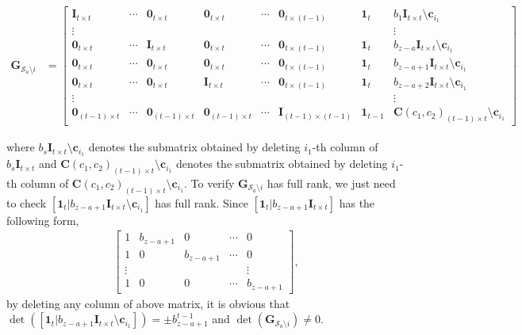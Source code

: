 \documentclass[journal,twocolumn]{IEEEtran}
\theoremstyle{definition}
\newcommand{\calS}{\mathcal{S}}
\newcommand{\bfc}{\mathbf{c}}
\newcommand{\bfG}{\mathbf{G}}
\newcommand{\bfI}{\mathbf{I}}
\newcommand{\bfC}{\mathbf{C}}
\newcommand{\bfzr}{\mathbf{0}}
\newcommand{\bfoe}{\mathbf{1}}
\begin{document}
\begin{itemize}
	\begin{table*}[t]
	\begin{align}
		\bfG_{\calS_a\setminus i}&=
		\begin{bmatrix}
			\bfI_{t\times t}& \cdots& \bfzr_{t\times t} &\bfzr_{t\times t} &\cdots&\bfzr_{t\times (t-1)}&\bfoe_t&{b_1}\bfI_{t\times t}\setminus \bfc_{i_1}\\
			\vdots&&&&&&&\vdots\\
			\bfzr_{t\times t}& \cdots& \bfI_{t\times t} &\bfzr_{t\times t} &\cdots&\bfzr_{t\times (t-1)}&\bfoe_t&{b_{z-a}}\bfI_{t\times t}\setminus \bfc_{i_1}\\
			\bfzr_{t\times t}& \cdots& \bfzr_{t\times t} &\bfzr_{t\times t} &\cdots&\bfzr_{t\times (t-1)}&\bfoe_t&{b_{z-a+1}}\bfI_{t\times t}\setminus \bfc_{i_1}\\
			\bfzr_{t\times t}& \cdots& \bfzr_{t\times t} &\bfI_{t\times t} &\cdots&\bfzr_{t\times (t-1)}&\bfoe_t&{b_{z-a+2}}\bfI_{t\times t}\setminus \bfc_{i_1}\\
			\vdots&&&&&&&\vdots\\
			\bfzr_{(t-1)\times t}& \cdots& \bfzr_{(t-1)\times t} &\bfzr_{(t-1)\times t} &\cdots&\bfI_{(t-1)\times (t-1)}&\bfoe_{t-1}&\bfC(c_1, c_2)_{(t-1)\times t}\setminus \bfc_{i_1}
		\end{bmatrix}
				\label{eq:case4_G2}
	\end{align}
\end{table*}
	where ${b_s}\bfI_{t\times t}\setminus \bfc_{i_1}$ denotes the submatrix obtained by deleting $i_1$-th column of ${b_s}\bfI_{t\times t}$ and $\bfC(c_1, c_2)_{(t-1)\times t}\setminus \bfc_{i_1}$ denotes the submatrix obtained by deleting $i_1$-th column of $\bfC(c_1, c_2)_{(t-1)\times t}\setminus \bfc_{i_1}$. To verify $\bfG_{\calS_a\setminus i}$ has full rank, we just need to check $[\bfoe_t|{b_{z-a+1}}\bfI_{t\times t}\setminus \bfc_{i_1}]$ has full rank. Since $[\bfoe_{t}|{b_{z-a+1}}\bfI_{t\times t}]$ has the following form,
	\begin{align*}
		\begin{bmatrix}
			1&b_{z-a+1} &0 &\cdots &0\\
			1&0 & b_{z-a+1}&\cdots &0\\
			\vdots&&&&\vdots\\
			1&0&0&\cdots&b_{z-a+1}
		\end{bmatrix},
	\end{align*}
	by deleting any column of above matrix, it is obvious that $\det([\bfoe_t|{b_{z-a+1}}\bfI_{t\times t}\setminus \bfc_{i_1}])=\pm b_{z-a+1}^{t-1}$ and $\det(\bfG_{\calS_a\setminus i})\neq 0$.
	
\end{itemize}
\end{document}
